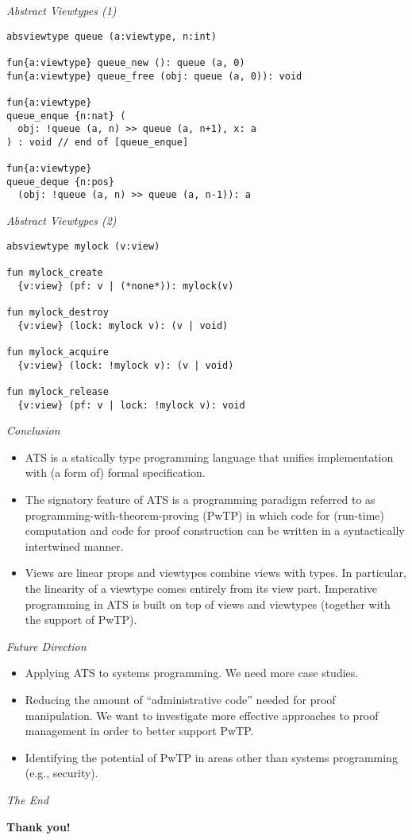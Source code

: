 \documentclass[pdf]{prosper}
\begin{document}
\begin{slide}{\em Abstract Viewtypes (1)}
{\blue\begin{verbatim}
absviewtype queue (a:viewtype, n:int)

fun{a:viewtype} queue_new (): queue (a, 0)
fun{a:viewtype} queue_free (obj: queue (a, 0)): void

fun{a:viewtype}
queue_enque {n:nat} (
  obj: !queue (a, n) >> queue (a, n+1), x: a
) : void // end of [queue_enque]

fun{a:viewtype}
queue_deque {n:pos}
  (obj: !queue (a, n) >> queue (a, n-1)): a
\end{verbatim}
}
\end{slide}
\begin{slide}{\em Abstract Viewtypes (2)}
{\blue\begin{verbatim}
absviewtype mylock (v:view)

fun mylock_create
  {v:view} (pf: v | (*none*)): mylock(v)

fun mylock_destroy
  {v:view} (lock: mylock v): (v | void)

fun mylock_acquire
  {v:view} (lock: !mylock v): (v | void)

fun mylock_release
  {v:view} (pf: v | lock: !mylock v): void
\end{verbatim}
}
\end{slide}
\begin{slide}{\em Conclusion}
\begin{itemize}
\item
ATS is a statically type programming language that unifies implementation
with (a form of) formal specification.
\item
The signatory feature of ATS is a programming paradigm referred to as
programming-with-theorem-proving (PwTP) in which code for (run-time)
computation and code for proof construction can be written in a
syntactically intertwined manner.
\item
Views are linear props and viewtypes combine views with types.  In
particular, the linearity of a viewtype comes entirely from its view part.
Imperative programming in ATS is built on top of views and viewtypes
(together with the support of PwTP).
\end{itemize}
\end{slide}
\begin{slide}{\em Future Direction}
\begin{itemize}
\item Applying ATS to systems programming. We need more case studies.
\item
Reducing the amount of ``administrative code'' needed for proof
manipulation. We want to investigate more effective approaches to proof
management in order to better support PwTP.
\item
Identifying the potential of PwTP in areas other than systems programming
(e.g., security).
\end{itemize}
\end{slide}
\begin{slide}{\em The End}
\vspace{72pt}
\begin{center}
{\huge\bf Thank you!}
\end{center}
\end{slide}
\end{document}
